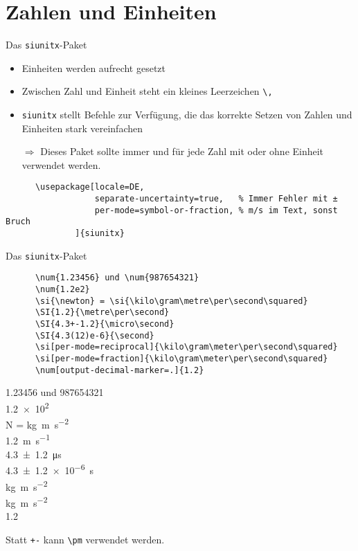 \section{Zahlen und Einheiten}

\begin{frame}[fragile]{
  Das \texttt{siunitx}-Paket
  \hfill{}
}
\begin{itemize}
    \item Einheiten werden aufrecht gesetzt
    \item Zwischen Zahl und Einheit steht ein kleines Leerzeichen \verb+\,+
    \item \texttt{siunitx} stellt Befehle zur Verfügung, die das korrekte Setzen von Zahlen und Einheiten stark vereinfachen
    \item[$\Rightarrow$] Dieses Paket sollte immer und für jede Zahl mit oder ohne Einheit verwendet werden.
\end{itemize}
  \begin{Packages}
    \begin{lstlisting}
      \usepackage[locale=DE,
                  separate-uncertainty=true,   % Immer Fehler mit ±
                  per-mode=symbol-or-fraction, % m/s im Text, sonst Bruch
              ]{siunitx}
    \end{lstlisting}
  \end{Packages}
\end{frame}

\begin{frame}[fragile]{Das \texttt{siunitx}-Paket}
  \begin{CodeExample}{0.60}
    \begin{lstlisting}
      \num{1.23456} und \num{987654321}
      \num{1.2e2}
      \si{\newton} = \si{\kilo\gram\metre\per\second\squared}
      \SI{1.2}{\metre\per\second}
      \SI{4.3+-1.2}{\micro\second}
      \SI{4.3(12)e-6}{\second}
      \si[per-mode=reciprocal]{\kilo\gram\meter\per\second\squared}
      \si[per-mode=fraction]{\kilo\gram\meter\per\second\squared}
      \num[output-decimal-marker=.]{1.2}
    \end{lstlisting}
  \CodeResult
    \num{1.23456} und \num{987654321} \\
    \num{1.2e2} \\
    \smallbreak
    \si{\newton} = \si{\kilo\gram\metre\per\second\squared} \\
    \medbreak
    \SI{1.2}{\metre\per\second} \\
    \SI{4.3(12)}{\micro\second} \\
    \SI{4.3(12)e-6}{\second} \\
    \si[per-mode=reciprocal]{\kilo\gram\meter\per\second\squared} \\[\baselineskip]
    \si[per-mode=fraction]{\kilo\gram\meter\per\second\squared} \\[\baselineskip]
    \num[output-decimal-marker=.]{1.2}
  \end{CodeExample}
  Statt \lstinline_+-_ kann  \lstinline+\pm+ verwendet werden.
\end{frame}
